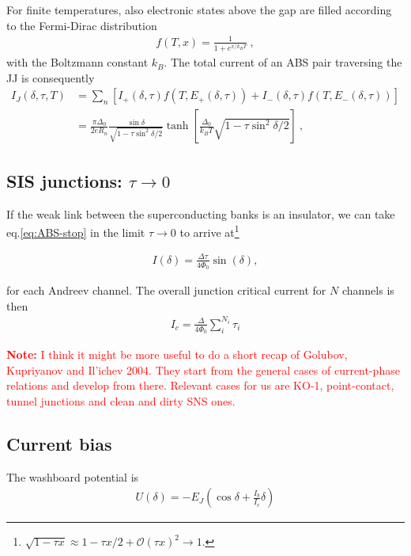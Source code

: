 For finite temperatures, also electronic states above the gap are filled according to the Fermi-Dirac distribution
\begin{align}
f(T,x)=\frac{1}{1+e^{x/k_BT}} \ ,
\label{eq:fermidirac}
\end{align}
with the Boltzmann constant $k_B$.
%
The total current of an ABS pair traversing the JJ is consequently
\begin{align}
I_J(\delta,\tau,T) &= \sum_n \left[ I_+\left(\delta,\tau\right) f\left(T,E_+\left(\delta,\tau\right)\right) + I_-\left(\delta,\tau\right) f\left(T,E_-\left(\delta,\tau\right)\right) \right] \\
&=\frac{\pi\Delta_0}{2 e R_n} \frac{\sin\delta}{\sqrt{1 - \tau \sin^2\delta / 2}} \tanh\left[\frac{\Delta_0}{k_B T} \sqrt{1 - \tau \sin^2\delta / 2}\right]\ ,
\label{eq:CPR-ball}
\end{align}



\subsection{SIS junctions: $\tau \rightarrow 0$}
If the weak link between the superconducting banks is an insulator, we can take eq.\ref{eq:ABS-stop} in the limit $\tau \rightarrow 0$ to arrive at\footnote{$\sqrt{1-\tau x}\approx 1-\tau x/2+\mathcal{O}(\tau x)^2\rightarrow 1$.}

\begin{eqnarray}
I(\delta)=\frac{\Delta\tau}{4\Phi_0}\sin(\delta),
\end{eqnarray}

for each Andreev channel. The overall junction critical current for $N$ channels is then 
\begin{eqnarray}
	I_c=\frac{\Delta}{4\Phi_0}\sum_{i}^{N_i}\tau_i
\end{eqnarray}

\textcolor{red}{\textbf{Note:} I think it might be more useful to do a short recap of Golubov, Kupriyanov and Il'ichev 2004. 
They start from the general cases of current-phase relations and develop from there.
Relevant cases for us are KO-1, point-contact, tunnel junctions and clean and dirty SNS ones.}

\subsection{Current bias}

The washboard potential is 
%
\begin{align}
U(\delta) = -E_J \left( \cos\delta + \frac{I_b}{I_c}\delta \right)
\label{eq:washboard}
\end{align}

